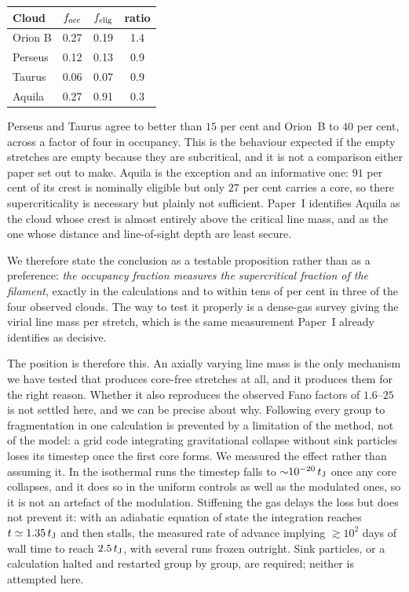\documentclass[usenatbib,twoside,twocolumn]{mnras}
\begin{document}
\begin{center}
\footnotesize
\begin{tabular}{lccc}
\toprule
Cloud & $f_{\rm occ}$ & $f_{\rm elig}$ & ratio \\
\midrule
Orion B & 0.27 & 0.19 & 1.4 \\
Perseus & 0.12 & 0.13 & 0.9 \\
Taurus  & 0.06 & 0.07 & 0.9 \\
\midrule
Aquila  & 0.27 & 0.91 & 0.3 \\
\bottomrule
\end{tabular}
\end{center}

\noindent Perseus and Taurus agree to better than $15$ per cent and Orion~B to $40$ per cent, across a factor of four in occupancy. This is the behaviour expected if the empty stretches are empty because they are subcritical, and it is not a comparison either paper set out to make. Aquila is the exception and an informative one: $91$ per cent of its crest is nominally eligible but only $27$ per cent carries a core, so there supercriticality is necessary but plainly not sufficient. Paper~I identifies Aquila as the cloud whose crest is almost entirely above the critical line mass, and as the one whose distance and line-of-sight depth are least secure.

We therefore state the conclusion as a testable proposition rather than as a preference: \emph{the occupancy fraction measures the supercritical fraction of the filament}, exactly in the calculations and to within tens of per cent in three of the four observed clouds. The way to test it properly is a dense-gas survey giving the virial line mass per stretch, which is the same measurement Paper~I already identifies as decisive.

The position is therefore this. An axially varying line mass is the only mechanism we have tested that produces core-free stretches at all, and it produces them for the right reason. Whether it also reproduces the observed Fano factors of $1.6$--$25$ is not settled here, and we can be precise about why. Following every group to fragmentation in one calculation is prevented by a limitation of the method, not of the model: a grid code integrating gravitational collapse without sink particles loses its timestep once the first core forms. We measured the effect rather than assuming it. In the isothermal runs the timestep falls to ${\sim}10^{-20}\,t_{\rm J}$ once any core collapses, and it does so in the uniform controls as well as the modulated ones, so it is not an artefact of the modulation. Stiffening the gas delays the loss but does not prevent it: with an adiabatic equation of state the integration reaches $t\simeq1.35\,t_{\rm J}$ and then stalls, the measured rate of advance implying $\gtrsim10^{2}$ days of wall time to reach $2.5\,t_{\rm J}$, with several runs frozen outright. Sink particles, or a calculation halted and restarted group by group, are required; neither is attempted here.
\end{document}
